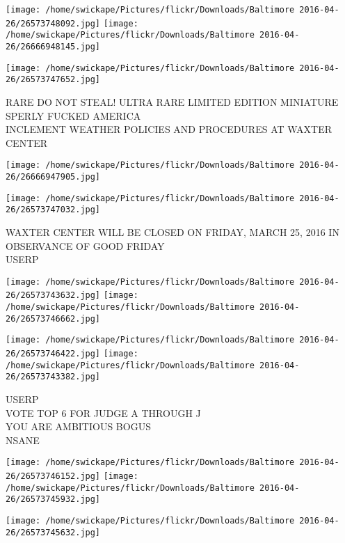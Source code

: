 \documentclass[10pt,letterpaper]{article}
\begin{document}
\texttt{[image: /home/swickape/Pictures/flickr/Downloads/Baltimore 2016-04-26/26573748092.jpg]}
\texttt{[image: /home/swickape/Pictures/flickr/Downloads/Baltimore 2016-04-26/26666948145.jpg]}

\texttt{[image: /home/swickape/Pictures/flickr/Downloads/Baltimore 2016-04-26/26573747652.jpg]}

RARE DO NOT STEAL!  ULTRA RARE LIMITED EDITION MINIATURE\\
SPERLY FUCKED AMERICA\\
INCLEMENT WEATHER POLICIES AND PROCEDURES AT WAXTER CENTER\\
\pagebreak

\texttt{[image: /home/swickape/Pictures/flickr/Downloads/Baltimore 2016-04-26/26666947905.jpg]}

\vspace{0.25in}
\texttt{[image: /home/swickape/Pictures/flickr/Downloads/Baltimore 2016-04-26/26573747032.jpg]}

WAXTER CENTER WILL BE CLOSED ON FRIDAY, MARCH 25, 2016 IN OBSERVANCE OF GOOD FRIDAY\\
USERP\\
\pagebreak

\texttt{[image: /home/swickape/Pictures/flickr/Downloads/Baltimore 2016-04-26/26573743632.jpg]}
\texttt{[image: /home/swickape/Pictures/flickr/Downloads/Baltimore 2016-04-26/26573746662.jpg]}

\texttt{[image: /home/swickape/Pictures/flickr/Downloads/Baltimore 2016-04-26/26573746422.jpg]}
\texttt{[image: /home/swickape/Pictures/flickr/Downloads/Baltimore 2016-04-26/26573743382.jpg]}

USERP\\
VOTE TOP 6 FOR JUDGE A THROUGH J\\
YOU ARE AMBITIOUS BOGUS\\
NSANE\\
\pagebreak

\texttt{[image: /home/swickape/Pictures/flickr/Downloads/Baltimore 2016-04-26/26573746152.jpg]}
\texttt{[image: /home/swickape/Pictures/flickr/Downloads/Baltimore 2016-04-26/26573745932.jpg]}

\vspace{0.25in}
\texttt{[image: /home/swickape/Pictures/flickr/Downloads/Baltimore 2016-04-26/26573745632.jpg]}
\end{document}
